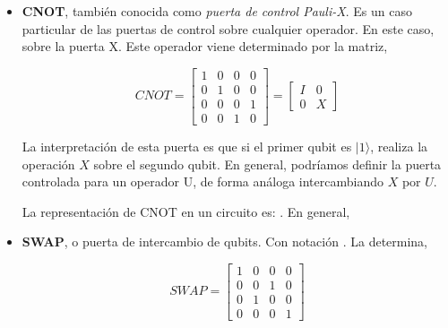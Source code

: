  \begin{itemize}
     \item \textbf{CNOT}, también conocida como \textit{puerta de control Pauli-X}. Es un caso particular de las puertas de control sobre cualquier operador. En este caso, sobre la puerta X. \newline 
     Este operador viene determinado por la matriz, 
     
     \begin{equation*}
     CNOT = \begin{bmatrix} 1 & 0 & 0 & 0\\0 & 1 & 0 & 0\\0 & 0 & 0 & 1\\0 & 0 & 1 & 0 \end{bmatrix}=\begin{bmatrix} I & 0  \\ 0 & X \end{bmatrix}
     \end{equation*}
     
     La interpretación de esta puerta es que si el primer qubit es $|1\rangle$, realiza la operación $X$ sobre el segundo qubit. En general, podríamos definir la puerta controlada para un operador U, de forma análoga intercambiando $X$ por $U$.\newline 
     
     La representación de CNOT en un circuito es: 
      . En general,
     
     \item \textbf{SWAP}, o puerta de intercambio de qubits. Con notación  . La determina,
     
     \begin{equation*}
     SWAP = \begin{bmatrix}
         1 & 0 & 0 & 0 \\ 0 & 0 & 1 & 0 \\ 0 & 1 & 0 & 0 \\ 0 & 0 & 0 & 1
     \end{bmatrix} \end{equation*}


\end{itemize}
